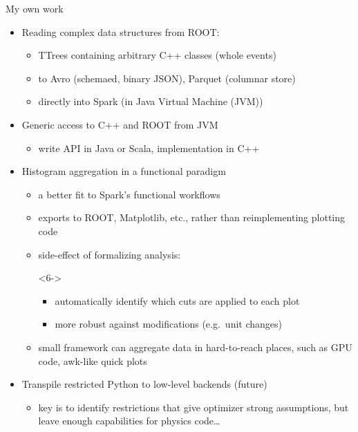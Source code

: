\documentclass{beamer}
\begin{document}
\begin{frame}{My own work}
\vspace{0.25 cm}
\begin{itemize}
\item<1-> \alert<1>{Reading complex data structures from ROOT:}
\begin{itemize}
\item \alert<1>{TTrees containing arbitrary C++ classes (whole events)}
\item \alert<1>{to Avro (schemaed, binary JSON), Parquet (columnar store)}
\item \alert<1>{directly into Spark (in Java Virtual Machine (JVM))}
\end{itemize}

\item<2-> \alert<2>{Generic access to C++ and ROOT from JVM}
\begin{itemize}
\item \alert<2>{write API in Java or Scala, implementation in C++}
\end{itemize}

\item<3-> \alert<3-7>{Histogram aggregation in a functional paradigm}
\begin{itemize}
\item<4-> \alert<4-7>{a better fit to Spark's functional workflows}
\item<5-> \alert<5-7>{exports to ROOT, Matplotlib, etc., rather than reimplementing plotting code}
\item<6-> \alert<6-7>{side-effect of formalizing analysis:}
\begin{uncoverenv}<6->
\begin{itemize}
\item \alert<6-7>{automatically identify which cuts are applied to each plot}
\item \alert<6-7>{more robust against modifications (e.g.\ unit changes)}
\end{itemize}
\end{uncoverenv}
\item<7-> \alert<7>{small framework can aggregate data in hard-to-reach places, such as GPU code, awk-like quick plots}
\end{itemize}

\item<8-> \alert<8>{Transpile restricted Python to low-level backends (future)}
\begin{itemize}
\item \alert<8>{key is to identify restrictions that give optimizer strong assumptions, but leave enough capabilities for physics code\ldots}
\end{itemize}
\end{itemize}
\end{frame}
\end{document}
